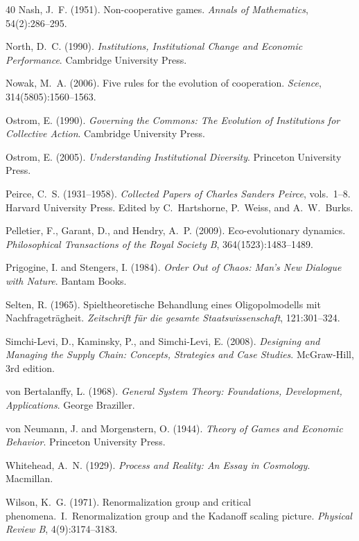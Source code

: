 \documentclass[12pt,a4paper,twocolumn]{article}
\begin{document}
\begin{thebibliography}{40}
Nash, J.~F. (1951).
\newblock Non-cooperative games.
\newblock \emph{Annals of Mathematics}, 54(2):286--295.

North, D.~C. (1990).
\newblock \emph{Institutions, Institutional Change and Economic Performance}.
\newblock Cambridge University Press.

Nowak, M.~A. (2006).
\newblock Five rules for the evolution of cooperation.
\newblock \emph{Science}, 314(5805):1560--1563.

Ostrom, E. (1990).
\newblock \emph{Governing the Commons: The Evolution of Institutions for Collective Action}.
\newblock Cambridge University Press.

Ostrom, E. (2005).
\newblock \emph{Understanding Institutional Diversity}.
\newblock Princeton University Press.

Peirce, C.~S. (1931--1958).
\newblock \emph{Collected Papers of Charles Sanders Peirce}, vols.~1--8.
\newblock Harvard University Press.
\newblock Edited by C.~Hartshorne, P.~Weiss, and A.~W.~Burks.

Pelletier, F., Garant, D., and Hendry, A.~P. (2009).
\newblock Eco-evolutionary dynamics.
\newblock \emph{Philosophical Transactions of the Royal Society B}, 364(1523):1483--1489.

Prigogine, I. and Stengers, I. (1984).
\newblock \emph{Order Out of Chaos: Man's New Dialogue with Nature}.
\newblock Bantam Books.

Selten, R. (1965).
\newblock Spieltheoretische Behandlung eines Oligopolmodells mit
  Nachfragetr\"{a}gheit.
\newblock \emph{Zeitschrift f\"{u}r die gesamte Staatswissenschaft}, 121:301--324.

Simchi-Levi, D., Kaminsky, P., and Simchi-Levi, E. (2008).
\newblock \emph{Designing and Managing the Supply Chain: Concepts, Strategies
  and Case Studies}.
\newblock McGraw-Hill, 3rd edition.

{von Bertalanffy}, L. (1968).
\newblock \emph{General System Theory: Foundations, Development, Applications}.
\newblock George Braziller.

{von Neumann}, J. and Morgenstern, O. (1944).
\newblock \emph{Theory of Games and Economic Behavior}.
\newblock Princeton University Press.

Whitehead, A.~N. (1929).
\newblock \emph{Process and Reality: An Essay in Cosmology}.
\newblock Macmillan.

Wilson, K.~G. (1971).
\newblock Renormalization group and critical phenomena.\ I.\ Renormalization
  group and the {K}adanoff scaling picture.
\newblock \emph{Physical Review B}, 4(9):3174--3183.

\end{thebibliography}
\end{document}
